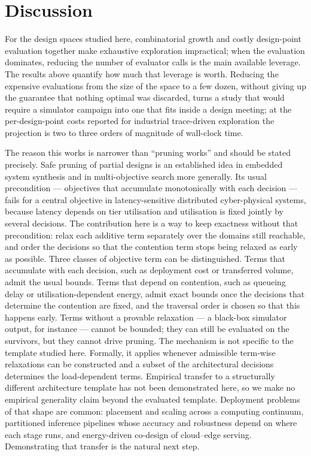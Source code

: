 \documentclass[pdflatex,sn-nature,lineno]{sn-jnl}
\begin{document}
\section{Discussion}
\label{sec:sn:discussion}

For the design spaces studied here, combinatorial growth and costly design-point
evaluation together make exhaustive exploration impractical; when the evaluation
dominates, reducing the number of evaluator calls is the main available leverage. The
results above quantify how much that leverage is worth. Reducing the expensive evaluations from the size of the
space to a few dozen, without giving up the guarantee that nothing optimal was discarded,
turns a study that would require a simulator campaign into one that fits inside a design
meeting; at the per-design-point costs reported for industrial trace-driven
exploration\cite{saadatmand2025compdse} the projection is two to three orders of
magnitude of wall-clock time.

The reason this works is narrower than ``pruning works'' and should be stated precisely.
Safe pruning of partial designs is an established idea in embedded system
synthesis\cite{neubauer2018exact,lukasiewycz2008symbolic} and in multi-objective search
more generally\cite{mandow2010namoa,paretopruning2022}. Its usual precondition ---
objectives that accumulate monotonically with each decision --- fails for a central objective in
latency-sensitive distributed cyber-physical systems, because latency depends on tier
utilisation and utilisation is fixed jointly by several decisions. The contribution here
is a way to keep exactness without that precondition: relax each additive term separately
over the domains still reachable, and order the decisions so that the contention term
stops being relaxed as early as possible. Three classes of objective term can be distinguished.
Terms that accumulate with each decision, such as deployment cost or transferred volume,
admit the usual bounds. Terms that depend on contention, such as queueing delay or
utilisation-dependent energy, admit exact bounds once the decisions that determine the
contention are fixed, and the traversal order is chosen so that this happens early. Terms
without a provable relaxation --- a black-box simulator output, for instance --- cannot be
bounded; they can still be evaluated on the survivors, but they cannot drive pruning.
The mechanism is not specific to the template
studied here. Formally, it applies whenever admissible term-wise relaxations can be constructed and a
subset of the architectural decisions determines the load-dependent terms. Empirical
transfer to a structurally different architecture template has not been demonstrated
here, so we make no empirical generality claim beyond the evaluated template. Deployment problems of that shape are common: placement and scaling
across a computing continuum\cite{filippini2026replica,predictive2026}, partitioned
inference pipelines whose accuracy and robustness depend on where each stage
runs\cite{guo2023,guo2025}, and energy-driven co-design of cloud--edge
serving\cite{cloud2026coopt}. Demonstrating that transfer is the natural next step.
\end{document}
